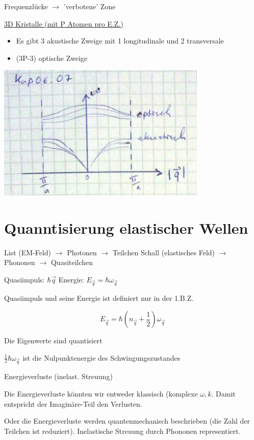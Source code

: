 Frequenzlücke \(\rightarrow\) 'verbotene' Zone

\underline{3D Kristalle (mit P Atomen pro E.Z.)}

\begin{itemize}
\item Es gibt 3 akustische Zweige mit 1 longitudinale und 2 transversale
\item (3P-3) optische Zweige
\end{itemize}

\includegraphics[width=0.75\textwidth]{kap06_07.png}

\section{Quanntisierung elastischer Wellen}

List (EM-Feld) \(\rightarrow\) Photonen \(\rightarrow\) Teilchen
Schall (elastisches Feld) \(\rightarrow\)  Phononen  \(\rightarrow\) Quasiteilchen

Quasiimpuls: \(\hbar \vec q\)
Energie: \(E_{\vec q}=\hbar \omega_{\vec q}\)

Quasiimpuls und seine Energie ist definiert nur in der 1.B.Z.

\[E_{\vec q}=\hbar(n_{\vec q}+\frac{1}{2})\omega_{\vec q}\]

Die Eigenwerte sind quantisiert

\(\frac{1}{2}\hbar \omega_{\vec q}\) ist die Nulpunktenergie des Schwingungszustandes

Energieverluste (inelast. Streuung)

Die Energieverluste könnten wir entweder klassisch (komplexe \(\omega,k\). Damit entspricht der Imaginäre-Teil den Verlusten. 

Oder die Energieverluste werden quantenmechanisch beschrieben (die Zahl der Teilchen ist reduziert). Inelastische Streuung durch Phononen representiert.

